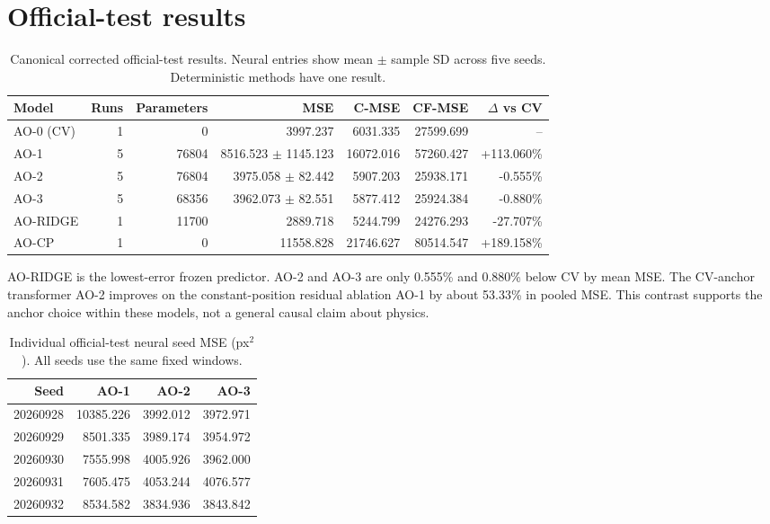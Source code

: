 \documentclass[11pt]{article}
\begin{document}
\section{Official-test results}
\begin{table}[H]\centering\small
\caption{Canonical corrected official-test results. Neural entries show mean $\pm$ sample SD across five seeds. Deterministic methods have one result.}\begin{tabular}{lrrrrrr}
\toprule Model & Runs & Parameters & MSE & C-MSE & CF-MSE & $\Delta$ vs CV \\
\midrule
AO-0 (CV) & 1 & 0 & 3997.237 & 6031.335 & 27599.699 & -- \\
AO-1 & 5 & 76804 & 8516.523 $\pm$ 1145.123 & 16072.016 & 57260.427 & +113.060\% \\
AO-2 & 5 & 76804 & 3975.058 $\pm$ 82.442 & 5907.203 & 25938.171 & -0.555\% \\
AO-3 & 5 & 68356 & 3962.073 $\pm$ 82.551 & 5877.412 & 25924.384 & -0.880\% \\
AO-RIDGE & 1 & 11700 & 2889.718 & 5244.799 & 24276.293 & -27.707\% \\
AO-CP & 1 & 0 & 11558.828 & 21746.627 & 80514.547 & +189.158\% \\
\bottomrule\end{tabular}\label{tab:official}
\end{table}

AO-RIDGE is the lowest-error frozen predictor. AO-2 and AO-3 are only 0.555\% and 0.880\% below CV by mean MSE. The CV-anchor transformer AO-2 improves on the constant-position residual ablation AO-1 by about 53.33\% in pooled MSE. This contrast supports the anchor choice within these models, not a general causal claim about physics.

\begin{table}[H]\centering\small
\caption{Individual official-test neural seed MSE (px$^2$). All seeds use the same fixed windows.}\begin{tabular}{r rrr}\toprule Seed & AO-1 & AO-2 & AO-3\\\midrule
20260928 & 10385.226 & 3992.012 & 3972.971\\
20260929 & 8501.335 & 3989.174 & 3954.972\\
20260930 & 7555.998 & 4005.926 & 3962.000\\
20260931 & 7605.475 & 4053.244 & 4076.577\\
20260932 & 8534.582 & 3834.936 & 3843.842\\\bottomrule\end{tabular}\label{tab:seeds}\end{table}
\end{document}
